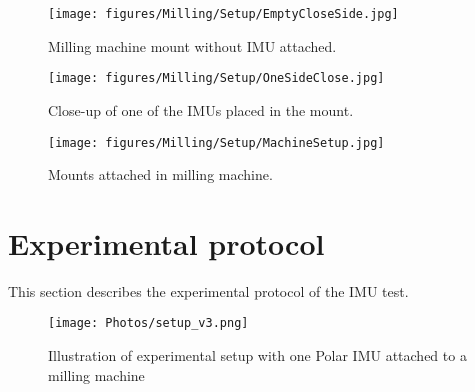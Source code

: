     \vspace{1cm}
    \begin{figure}[h]
        \centering
        \texttt{[image: figures/Milling/Setup/EmptyCloseSide.jpg]}
        \caption{Milling machine mount without IMU attached.}
        \label{fig:mil:emptymount}
    \end{figure}
    
    \vspace{1cm}
    
    \begin{figure}[h]
        \centering
        \texttt{[image: figures/Milling/Setup/OneSideClose.jpg]}
        \caption{Close-up of one of the IMUs placed in the mount.}
        \label{fig:mil:mountsensorclose}
    \end{figure}
    
    \vspace{1cm}
    
    \begin{figure}[h]
        \centering
        \texttt{[image: figures/Milling/Setup/MachineSetup.jpg]}
        \caption{Mounts attached in milling machine.}
        \label{fig:mil:mountmachine}
    \end{figure}
    \newpage

\section{Experimental protocol}
This section describes the experimental protocol of the IMU test. \\

\begin{figure}[h!]
    \centering
    \texttt{[image: Photos/setup\_v3.png]}
    \caption{Illustration of experimental setup with one Polar IMU attached to a milling machine}
    \label{fig:Setup}
\end{figure}



